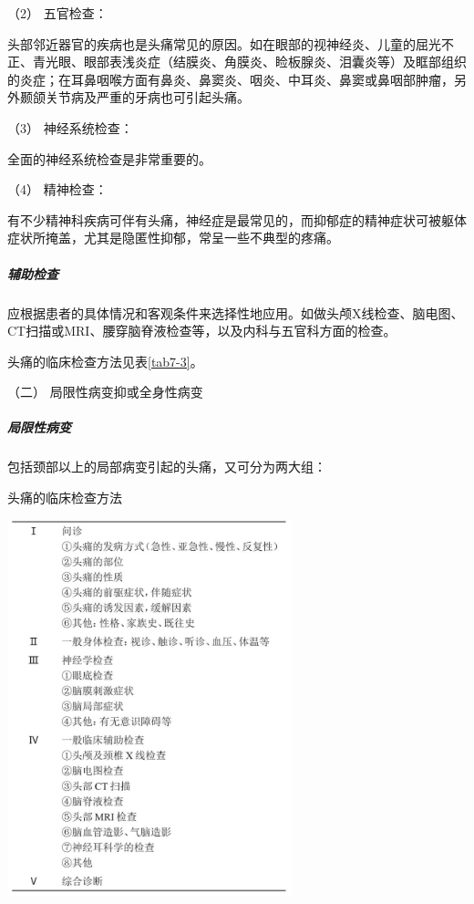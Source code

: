 \hypertarget{text00020.htmlux5cux23CHP1-7-2-1-2-2}{}
（2） 五官检查：

头部邻近器官的疾病也是头痛常见的原因。如在眼部的视神经炎、儿童的屈光不正、青光眼、眼部表浅炎症（结膜炎、角膜炎、睑板腺炎、泪囊炎等）及眶部组织的炎症；在耳鼻咽喉方面有鼻炎、鼻窦炎、咽炎、中耳炎、鼻窦或鼻咽部肿瘤，另外颞颌关节病及严重的牙病也可引起头痛。

\hypertarget{text00020.htmlux5cux23CHP1-7-2-1-2-3}{}
（3） 神经系统检查：

全面的神经系统检查是非常重要的。

\hypertarget{text00020.htmlux5cux23CHP1-7-2-1-2-4}{}
（4） 精神检查：

有不少精神科疾病可伴有头痛，神经症是最常见的，而抑郁症的精神症状可被躯体症状所掩盖，尤其是隐匿性抑郁，常呈一些不典型的疼痛。

\subparagraph{辅助检查}

应根据患者的具体情况和客观条件来选择性地应用。如做头颅X线检查、脑电图、CT扫描或MRI、腰穿脑脊液检查等，以及内科与五官科方面的检查。

头痛的临床检查方法见表\ref{tab7-3}。

\hypertarget{text00020.htmlux5cux23CHP1-7-2-2}{}
（二） 局限性病变抑或全身性病变

\subparagraph{局限性病变}

包括颈部以上的局部病变引起的头痛，又可分为两大组：

\begin{table}[htbp]
\centering
\caption{头痛的临床检查方法}
\label{tab7-3}
\includegraphics[width=3.25in,height=4.30208in]{./images/Image00041.jpg}
\end{table}

